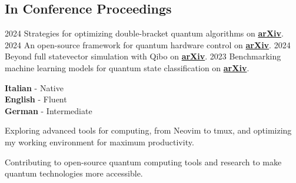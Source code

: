 \documentclass[9pt]{developercv} %
\begin{document}
\subsection*{In Conference Proceedings}

\begin{entrylist}

    \entry
        {2024}
        {Strategies for optimizing double-bracket quantum algorithms}
        {}
        {on \href{https://arxiv.org/abs/2408.07431}{\textbf{arXiv}}.} 
    \entry
        {2024}
        {An open-source framework for quantum hardware control}
        {}
        {on \href{https://arxiv.org/abs/2407.21737}{\textbf{arXiv}}.} 
    \entry
        {2024}
        {Beyond full statevector simulation with Qibo}
        {}
        {on \href{https://arxiv.org/abs/2408.00384}{\textbf{arXiv}}.} 
    \entry
        {2023}
        {Benchmarking machine learning models for quantum state classification}
        {}
        {on \href{https://arxiv.org/abs/2309.07679}{\textbf{arXiv}}.} 

\end{entrylist}

\begin{minipage}[t]{0.3\textwidth} %
	\vspace{-\baselineskip} %

	
	\textbf{Italian} - Native\\
	\textbf{English} - Fluent\\
	\textbf{German} - Intermediate
\end{minipage}
\hfill %
\begin{minipage}[t]{0.3\textwidth} %
	\vspace{-\baselineskip} %
	
	
	Exploring advanced tools for computing, from Neovim to tmux, and optimizing my working environment for maximum productivity.
\end{minipage}
\hfill %
\begin{minipage}[t]{0.3\textwidth} %
	\vspace{-\baselineskip} %
	
	
	Contributing to open-source quantum computing tools and research to make quantum technologies more accessible.
\end{minipage}

\end{document}
